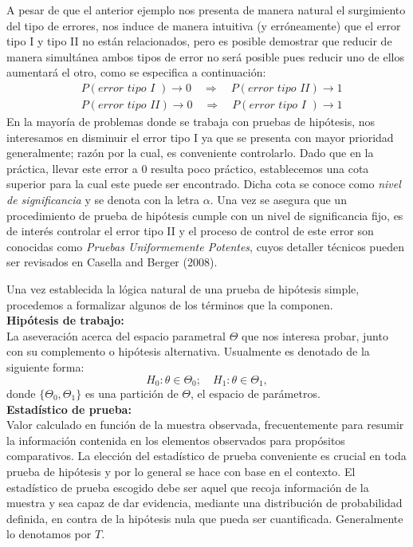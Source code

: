 \documentclass[11pt,letterpaper]{article}
\begin{document}
A pesar de que el anterior ejemplo nos presenta de manera natural el surgimiento del tipo de errores, nos induce de manera intuitiva (y erróneamente) que el error tipo I y tipo II no están relacionados, pero es posible demostrar que reducir de manera simultánea ambos tipos de error no será posible pues reducir uno de
ellos aumentará el otro, como se especifica a continuación:
\begin{align*}
	&P(\textit{error tipo I })\to0\quad \Longrightarrow \quad P(\textit{error tipo II} )\to 1\\
	&P(\textit{error tipo II})\to0 \quad\Longrightarrow \quad P(\textit{error tipo I } )\to 1
\end{align*}
En la mayoría de problemas donde se trabaja con pruebas de hipótesis, nos interesamos en disminuir el error tipo I ya que se presenta con mayor prioridad generalmente; razón por la cual, es conveniente controlarlo. Dado que en la práctica, llevar este error a 0 resulta poco práctico, establecemos una cota superior para la cual este puede ser encontrado. Dicha cota se conoce como \textit{nivel de significancia} y se denota con la letra $\alpha$.  Una vez se asegura que un procedimiento de prueba de hipótesis cumple con un nivel de significancia fijo, es de interés controlar el error tipo II y el proceso de control de este error son conocidas como \textit{Pruebas Uniformemente Potentes}, cuyos detaller técnicos pueden ser revisados en Casella and Berger (2008).

Una vez establecida la lógica natural de una prueba de hipótesis simple, procedemos a formalizar algunos de los términos que la componen.\\

\textbf{Hipótesis de trabajo:}\\
La aseveración acerca del espacio parametral $\Theta$ que nos interesa probar,
junto con su complemento o hipótesis alternativa. Usualmente es denotado de la siguiente forma:
$$H_0:\theta\in\Theta_0; \quad H_1: \theta\in\Theta_1,$$
donde $\{\Theta_0,\Theta_1\}$ es una partición de $\Theta$, el espacio de parámetros.\\

\textbf{Estadístico de prueba:} \\
Valor calculado en función de la muestra observada, frecuentemente
para resumir la información contenida en los elementos observados para propósitos comparativos.
La elección del estadístico de prueba conveniente es crucial en toda prueba de hipótesis y por lo
general se hace con base en el contexto. El estadístico de prueba escogido debe ser aquel que recoja
información de la muestra y sea capaz de dar evidencia, mediante una distribución de probabilidad
definida, en contra de la hipótesis nula que pueda ser cuantificada. Generalmente lo denotamos por $T$.\\
\end{document}
